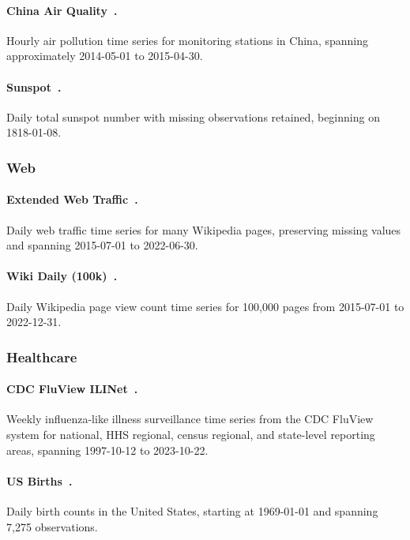 \documentclass[11pt]{article}
\begin{document}
\paragraph{China Air Quality~\citep{zheng2015forecasting}.}
Hourly air pollution time series for monitoring stations in China, spanning approximately 2014-05-01 to 2015-04-30.

\paragraph{Sunspot~\citep{godahewa2021monash}.}
Daily total sunspot number with missing observations retained, beginning on 1818-01-08.

\subsubsection{Web}

\paragraph{Extended Web Traffic~\citep{godahewa2021monash}.}
Daily web traffic time series for many Wikipedia pages, preserving missing values and spanning 2015-07-01 to 2022-06-30.

\paragraph{Wiki Daily (100k)~\citep{ansarichronos}.}
Daily Wikipedia page view count time series for 100{,}000 pages from 2015-07-01 to 2022-12-31.

\subsubsection{Healthcare}

\paragraph{CDC FluView ILINet~\citep{ansarichronos}.}
Weekly influenza-like illness surveillance time series from the CDC FluView system for national, HHS regional, census regional, and state-level reporting areas, spanning 1997-10-12 to 2023-10-22.

\paragraph{US Births~\citep{godahewa2021monash}.}
Daily birth counts in the United States, starting at 1969-01-01 and spanning 7{,}275 observations.
\end{document}
